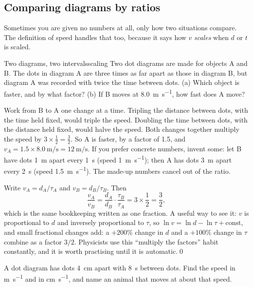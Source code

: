 \subsection{Comparing diagrams by ratios}

Sometimes you are given no numbers at all, only how two situations compare. The definition of speed handles that too, because it says how $v$ \emph{scales} when $d$ or $t$ is scaled.

\begin{example}{Two diagrams, two intervals}{scaling}
Two dot diagrams are made for objects A and B. The dots in diagram A are three times as far apart as those in diagram B, but diagram A was recorded with twice the time between dots. (a) Which object is faster, and by what factor? (b) If B moves at \SI{8.0}{\metre\per\second}, how fast does A move?

\elem Work from B to A one change at a time. Tripling the distance between dots, with the time held fixed, would triple the speed. Doubling the time between dots, with the distance held fixed, would halve the speed. Both changes together multiply the speed by $3 \times \tfrac12 = \tfrac32$. So A is faster, by a factor of \num{1.5}, and $v_A = 1.5 \times \SI{8.0}{\metre\per\second} = \SI{12}{\metre\per\second}$. If you prefer concrete numbers, invent some: let B have dots \SI{1}{\metre} apart every \SI{1}{\second} (speed \SI{1}{\metre\per\second}); then A has dots \SI{3}{\metre} apart every \SI{2}{\second} (speed \SI{1.5}{\metre\per\second}). The made-up numbers cancel out of the ratio.

\calc Write $v_A = d_A/\tau_A$ and $v_B = d_B/\tau_B$. Then
\[
\frac{v_A}{v_B} = \frac{d_A}{d_B}\cdot\frac{\tau_B}{\tau_A} = 3 \times \frac12 = \frac32,
\]
which is the same bookkeeping written as one fraction. A useful way to see it: $v$ is proportional to $d$ and inversely proportional to $\tau$, so $\ln v = \ln d - \ln \tau + \text{const}$, and small fractional changes add: a $+200\%$ change in $d$ and a $+100\%$ change in $\tau$ combine as a factor $3/2$. Physicists use this ``multiply the factors'' habit constantly, and it is worth practising until it is automatic.\qed
\end{example}

\begin{checkbox}
A dot diagram has dots \SI{4}{\centi\metre} apart with \SI{8}{\second} between dots. Find the speed in \si{\metre\per\second} and in \si{\centi\metre\per\second}, and name an animal that moves at about that speed.
\end{checkbox}

